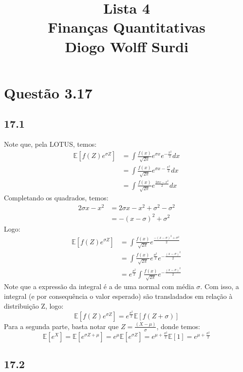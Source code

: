 \documentclass[12pt]{article}
\title{Lista 4\\
Finanças Quantitativas\\
Diogo Wolff Surdi}
\date{}
\begin{document}
\maketitle

\section*{Questão 3.17}

\subsection*{17.1}
Note que, pela LOTUS, temos:
\begin{align*}
\mathbb{E}[f(Z)e^{\sigma Z}]&=\int\frac{f(x)}{\sqrt{2\pi}}e^{\sigma x}
e^{-\frac{x^2}{2}}dx\\
&=\int\frac{f(x)}{\sqrt{2\pi}}e^{\sigma x-\frac{x^2}{2}}dx\\
&=\int\frac{f(x)}{\sqrt{2\pi}}e^{\frac{2\sigma x - x^2}{2}}dx
\end{align*}
Completando os quadrados, temos:
\begin{align*}
2\sigma x - x^2&=2\sigma x - x^2+\sigma^2 -\sigma^2\\
&=-(x-\sigma)^2+\sigma^2
\end{align*}
Logo:
\begin{align*}
\mathbb{E}[f(Z)e^{\sigma Z}]&=\int\frac{f(x)}{\sqrt{2\pi}}
e^{\frac{-(x-\sigma)^2+\sigma^2}{2}}\\
&=\int\frac{f(x)}{\sqrt{2\pi}}e^{\frac{\sigma^2}{2}}
e^{-\frac{(x-\sigma)^2}{2}}\\
&=e^{\frac{\sigma^2}{2}}\int\frac{f(x)}{\sqrt{2\pi}}
e^{-\frac{(x-\sigma)^2}{2}}
\end{align*}
Note que a expressão da integral é a de uma normal com média $\sigma$. Com isso, a integral (e por consequência o valor esperado) são transladados em relação à distribuição Z, logo:
\begin{equation*}
\mathbb{E}[f(Z)e^{\sigma Z}]=e^{\frac{\sigma^2}{2}}\mathbb{E}[f(Z+\sigma)]
\end{equation*}
Para a segunda parte, basta notar que $Z=\frac{(X-\mu)}{\sigma}$, donde temos:
\begin{equation*}
\mathbb{E}[e^X]=\mathbb{E}[e^{\sigma Z + \mu}]=e^{\mu}\mathbb{E}[e^{\sigma Z}]=e^{\mu+\frac{\sigma^2}{2}}\mathbb{E}[1]=e^{\mu+\frac{\sigma^2}{2}}
\end{equation*}

\subsection*{17.2}
\end{document}
